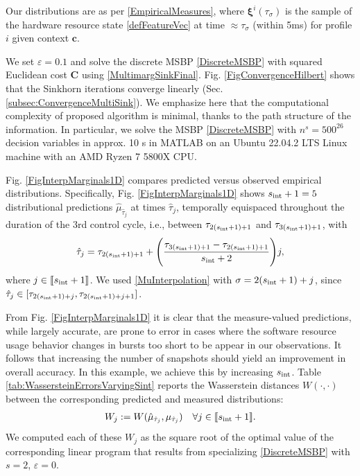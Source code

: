 \documentclass[letterpaper, 10pt, twocolumn]{ieeeconf}      %
\begin{document}
Our distributions are as per \eqref{EmpiricalMeasures}, where $\bm{\xi}^{i}(\tau_{\sigma})$ is the sample of the hardware resource state \eqref{defFeatureVec} at time $\approx\tau_\sigma$ (within 5ms) for profile $i$ given context $\bm{c}$. %

We set $\varepsilon=0.1$ and solve the discrete MSBP \eqref{DiscreteMSBP} with squared Euclidean cost $\bm{C}$ using \eqref{MultimargSinkFinal}. Fig. \ref{FigConvergenceHilbert} shows that the Sinkhorn iterations converge linearly (Sec. \ref{subsec:ConvergenceMultiSink}). We emphasize here that the computational complexity of proposed algorithm is minimal, thanks to the path structure of the information. In particular, we solve the MSBP \eqref{DiscreteMSBP} with $n^{s} = 500^{26}$ decision variables in approx. 10 s in MATLAB on an Ubuntu 22.04.2 LTS Linux machine with an AMD Ryzen 7 5800X CPU.

Fig. \ref{FigInterpMarginals1D} compares predicted versus observed empirical distributions. Specifically, Fig. \ref{FigInterpMarginals1D} shows $s_{\rm{int}}+1=5$ distributional predictions $\hat{\mu}_{\hat{\tau}_j}$ at times $\hat{\tau}_j$, temporally equispaced throughout the duration of the 3rd control cycle, i.e., between $\tau_{2(s_{\rm{int}}+1)+1}$ and $\tau_{3(s_{\rm{int}}+1)+1}$, with
$$ \hat{\tau}_j=\tau_{2(s_{\rm{int}}+1)+1} + \Bigg(\frac{\tau_{3(s_{\rm{int}}+1)+1}-\tau_{2(s_{\rm{int}}+1)+1}}{s_{\rm{int}}+2}\Bigg)j, $$
where $j\in\llbracket s_{\rm{int}}+1 \rrbracket$. We used \eqref{MuInterpolation} with $\sigma=2(s_{\rm{int}}+1)+j$, since $\hat{\tau}_j\in[\tau_{2(s_{\rm{int}}+1)+j},\tau_{2(s_{\rm{int}}+1)+j+1}]$.

From Fig. \ref{FigInterpMarginals1D} it is clear that the measure-valued predictions, while largely accurate, are prone to error in cases where the software resource usage behavior changes in bursts too short to be appear in our observations. It follows that increasing the number of snapshots should yield an improvement in overall accuracy. In this example, we achieve this by increasing $s_{\rm{int}}$. Table \ref{tab:WassersteinErrorsVaryingSint} reports the Wasserstein distances $W(\cdot,\cdot)$ between the corresponding predicted and measured distributions:
\begin{align}
W_j := W(\hat{\mu}_{\hat{\tau}_j},\mu_{\hat{\tau}_j}) \quad\forall j\in\llbracket s_{\rm{int}}+1 \rrbracket.
\label{Wasserstein}
\end{align}
We computed each of these $W_j$ as the square root of the optimal value of the corresponding linear program that results from specializing \eqref{DiscreteMSBP} with $s=2$, $\varepsilon=0$.
\end{document}
